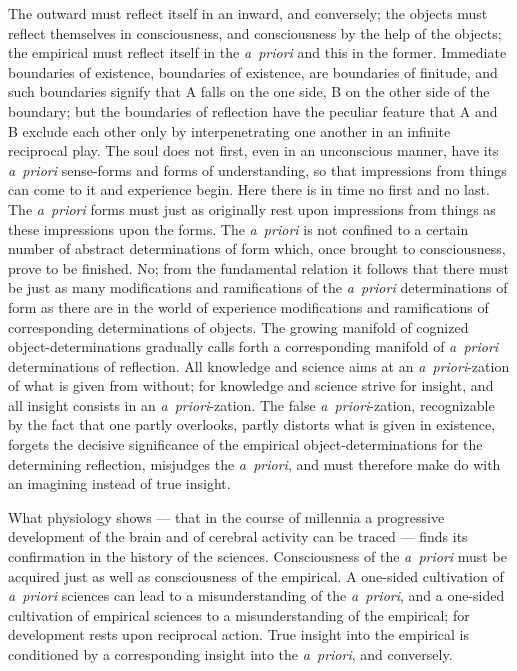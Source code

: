 \documentclass[12pt]{book}
\begin{document}
The outward must reflect itself in an inward, and conversely; the objects must
reflect themselves in consciousness, and consciousness by the help of the
objects; the empirical must reflect itself in the \textit{a~priori} and this
in the former. Immediate boundaries of existence, boundaries of existence, are
boundaries of finitude, and such boundaries signify that A falls on the one
side, B on the other side of the boundary; but the boundaries of reflection
have the peculiar feature that A and B exclude each other only by
interpenetrating one another in an infinite reciprocal play. The soul does not
first, even in an unconscious manner, have its \textit{a~priori} sense-forms
and forms of understanding, so that impressions from things can come to it and
experience begin. Here there is in time no first and no last. The
\textit{a~priori} forms must just as originally rest upon impressions from
things as these impressions upon the forms. The \textit{a~priori} is not
confined to a certain number of abstract determinations of form which, once
brought to consciousness, prove to be finished. No; from the fundamental
relation it follows that there must be just as many modifications and
ramifications of the \textit{a~priori} determinations of form as there are in
the world of experience modifications and ramifications of corresponding
determinations of objects. The growing manifold of cognized object-determinations
gradually calls forth a corresponding manifold of \textit{a~priori}
determinations of reflection. All knowledge and science aims at an
\textit{a~priori}-zation of what is given from without; for knowledge and
science strive for insight, and all insight consists in an
\textit{a~priori}-zation. The false \textit{a~priori}-zation, recognizable by
the fact that one partly overlooks, partly distorts what is given in
existence, forgets the decisive significance of the empirical
object-determinations for the determining reflection, misjudges the
\textit{a~priori}, and must therefore make do with an imagining instead of true
insight.

What physiology shows --- that in the course of millennia a progressive
development of the brain and of cerebral activity can be traced --- finds its
confirmation in the history of the sciences. Consciousness of the
\textit{a~priori} must be acquired just as well as consciousness of the
empirical. A one-sided cultivation of \textit{a~priori} sciences can lead to a
misunderstanding of the \textit{a~priori}, and a one-sided cultivation of
empirical sciences to a misunderstanding of the empirical; for development
rests upon reciprocal action. True insight into the empirical is conditioned
by a corresponding insight into the \textit{a~priori}, and conversely.
\end{document}
